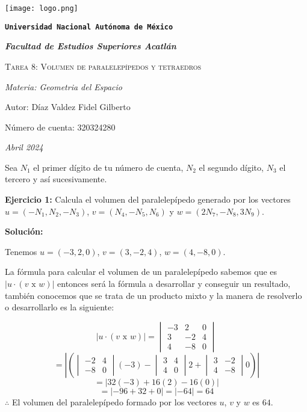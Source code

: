 \documentclass{article}
\begin{document}
\begin{titlepage}
   \centering  
   {\texttt{[image: logo.png]}\par}
   {\texttt{\bfseries \LARGE Universidad Nacional Autónoma de México} \par}
   \vspace{1cm}
   {\itshape \Large \bfseries Facultad de Estudios Superiores Acatlán \par}
   \vspace{3cm}
   {\scshape \Huge Tarea 8: Volumen de paralelepípedos y tetraedros \par}
   \vspace {3cm}
   {\slshape \Large Materia: Geometria del Espacio \par}
   \vspace{2cm}
   {\Large Autor: Díaz Valdez Fidel Gilberto\par}
   {\Large Número de cuenta: 320324280\par}
   \vfill
   {\itshape Abril 2024 \par}
\end{titlepage}


Sea $N_1$ el primer dígito de tu número de cuenta, $N_2$ el segundo dígito, $N_3$ el tercero y así
sucesivamente.
\vspace{10pt}


\textbf{Ejercicio 1:} Calcula el volumen del paralelepípedo generado por los vectores $u = (-N_1, N_2, -N_3)$, $v = (N_4,-N_5, N_6)$ y
$w =(2N_7,-N_8,3N_9)$.
\vspace{10pt}


\textbf{Solución:}
\vspace{10pt}


Tenemos $u =(-3, 2, 0)$, $v =(3,-2, 4)$, $w =(4,-8,0)$.


La fórmula para calcular el volumen de un paralelepípedo sabemos que es $\left| u \cdot(v\text{ x }w)\right|$ entonces será la fórmula a desarrollar y
conseguir un resultado, también conocemos que se trata de un producto mixto y la manera de resolverlo o desarrollarlo es la siguiente:


$$\left| u \cdot(v\text{ x }w)\right|= \begin{vmatrix}
   -3 & 2 & 0 \\
   3 & -2 & 4 \\
   4 & -8 & 0
\end{vmatrix}$$
$$= \left|\left(\begin{vmatrix}
   -2 & 4 \\
   -8 & 0
\end{vmatrix}(-3) -\begin{vmatrix}
   3 & 4 \\
   4 & 0
\end{vmatrix}2 +\begin{vmatrix}
   3 & -2 \\
   4 & -8
\end{vmatrix}0 \right)\right|$$
$$= \left|32(-3 ) +16(2)- 16(0)\right|$$
$$= \left|-96 +32+ 0\right|  =\left|-64 \right| = 64 $$
$\therefore$ El volumen del paralelepípedo formado por los vectores $u$, $v$ y $w$ es $64$.
\vspace{10pt}
\end{document}
